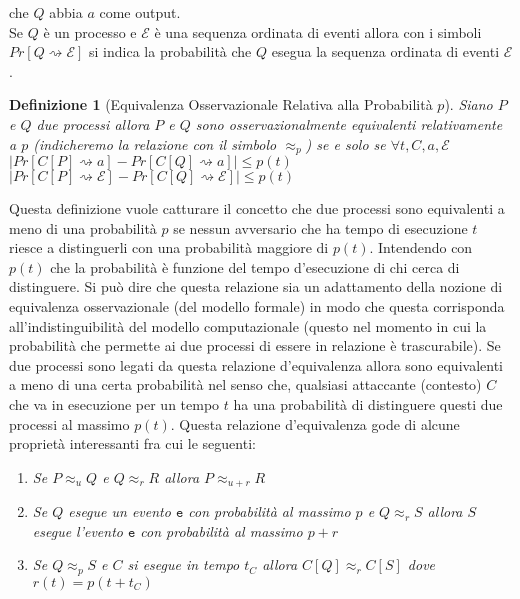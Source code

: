 \documentclass[a4paper,openright,twoside,12pt]{report}
\newtheorem{definizione}{Definizione}[chapter]
\begin{document}
che $Q$ abbia $a$ come output. \\
Se $Q$ \`e un processo e $\mathcal{E}$ \`e una sequenza ordinata di eventi allora con i simboli $Pr[Q \rightsquigarrow \mathcal{E}]$ si indica la probabilit\`a che $Q$ esegua la sequenza ordinata di eventi $\mathcal{E}$ . 
\begin{definizione}[Equivalenza Osservazionale Relativa alla Probabilit\`a $p$]
Siano $P$ e $Q$ due processi allora $P$ e $Q$ sono osservazionalmente equivalenti relativamente a $p$ (indicheremo la relazione con il simbolo $\approx_p$) se e solo se $\forall t, C, a, \mathcal{E}$
$\lvert Pr[C[P] \rightsquigarrow a] - Pr[C[Q]\rightsquigarrow a] \rvert \leq p(t)$ $\lvert Pr[C[P] \rightsquigarrow \mathcal{E}] -  Pr[C[Q] \rightsquigarrow \mathcal{E}]\rvert \leq p(t)$ 
\end{definizione}
Questa definizione vuole catturare il concetto che due processi sono equivalenti a meno di una probabilit\`a $p$ se nessun avversario che ha tempo di esecuzione $t$ riesce
a distinguerli con una probabilit\`a maggiore di $p(t)$. Intendendo con $p(t)$ che la probabilit\`a \`e funzione del tempo d'esecuzione di chi cerca di distinguere. 
Si pu\`o dire che questa relazione sia un adattamento della nozione di equivalenza osservazionale (del modello formale) in modo che questa corrisponda all'indistinguibilit\`a 
del modello computazionale 
(questo nel momento in cui la probabilit\`a che permette ai due processi di essere in relazione \`e trascurabile). Se due processi sono legati da questa relazione d'equivalenza 
allora sono equivalenti a meno di una certa probabilit\`a nel senso che, 
qualsiasi attaccante (contesto) $C$ che va in esecuzione per un tempo $t$ ha una probabilit\`a di distinguere questi due processi al massimo $p(t)$.
Questa relazione d'equivalenza gode di alcune propriet\`a interessanti fra cui le seguenti:
\begin{enumerate}
 \item \emph{Se $P \approx_u Q$ e $Q \approx_{r} R$ allora $P \approx_{u+r} R$}
 \item \emph{Se $Q$ esegue un evento $\texttt{e}$ con probabilit\`a al massimo $p$ e $Q \approx_r S$ allora $S$ esegue l'evento $\texttt{e}$ con probabilit\`a al massimo $p+r$}
 \item \emph{Se $Q \approx_p S$ e $C$ si esegue in tempo $t_C$ allora $C[Q] \approx_{r} C[S]$ dove $r(t)=p(t+t_C)$}
\end{enumerate}
\end{document}
